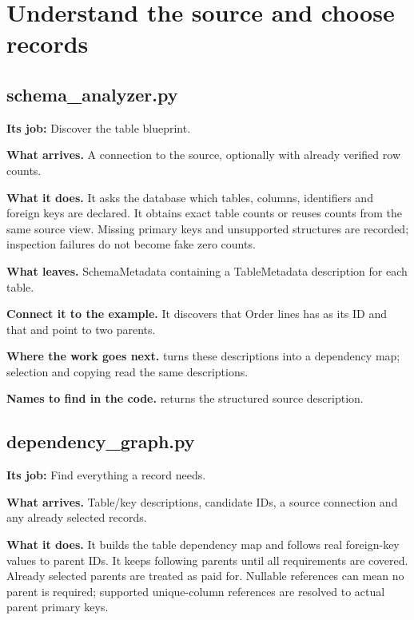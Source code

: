 \section{Understand the source and choose records}


\subsection{schema\_analyzer.py}

\textbf{Its job:} Discover the table blueprint.

\textbf{What arrives.} A connection to the source, optionally with already verified row counts.

\textbf{What it does.} It asks the database which tables, columns, identifiers and foreign keys are declared. It obtains exact table counts or reuses counts from the same source view. Missing primary keys and unsupported structures are recorded; inspection failures do not become fake zero counts.

\textbf{What leaves.} SchemaMetadata containing a TableMetadata description for each table.

\textbf{Connect it to the example.} It discovers that Order lines has  as its ID and that  and  point to two parents.

\textbf{Where the work goes next.}  turns these descriptions into a dependency map; selection and copying read the same descriptions.

\textbf{Names to find in the code.}  returns the structured source description.


\subsection{dependency\_graph.py}

\textbf{Its job:} Find everything a record needs.

\textbf{What arrives.} Table/key descriptions, candidate IDs, a source connection and any already selected records.

\textbf{What it does.} It builds the table dependency map and follows real foreign-key values to parent IDs. It keeps following parents until all requirements are covered. Already selected parents are treated as paid for. Nullable references can mean no parent is required; supported unique-column references are resolved to actual parent primary keys.

